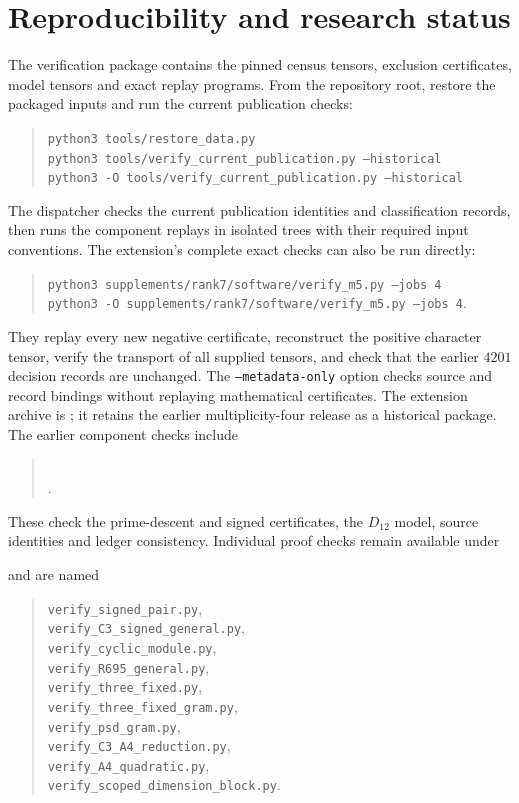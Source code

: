 \documentclass[11pt]{article}
\begin{document}
\section{Reproducibility and research status}
The verification package contains the pinned census tensors, exclusion
certificates, model tensors and exact replay programs. From the repository
root, restore the packaged inputs and run the current publication checks:
\begin{quote}\small
\texttt{python3 tools/restore\_data.py}\\
\texttt{python3 tools/verify\_current\_publication.py --historical}\\
\texttt{python3 -O tools/verify\_current\_publication.py --historical}
\end{quote}
The dispatcher checks the current publication identities and classification
records, then runs the component replays in isolated trees with their
required input conventions. The extension's complete exact checks can
also be run directly:
\begin{quote}\small
\texttt{python3 supplements/rank7/software/verify\_m5.py --jobs 4}\\
\texttt{python3 -O supplements/rank7/software/verify\_m5.py --jobs 4}.
\end{quote}
They replay every new negative certificate, reconstruct the positive
character tensor, verify the transport of all supplied tensors, and
check that the earlier $4201$ decision records are unchanged.
The \texttt{--metadata-only} option checks source and record bindings
without replaying mathematical certificates. The extension archive is
; it
retains the earlier multiplicity-four release as a historical package.
The earlier component checks include
\begin{quote}\small
{}\\
.
\end{quote}
These check the prime-descent and signed certificates, the $D_{12}$ model,
source identities and ledger consistency. Individual proof checks remain
available under
\begin{quote}\small
{}
\end{quote}
and are named
\begin{quote}\small
\texttt{verify\_signed\_pair.py},\\
\texttt{verify\_C3\_signed\_general.py},\\
\texttt{verify\_cyclic\_module.py},\\
\texttt{verify\_R695\_general.py},\\
\texttt{verify\_three\_fixed.py},\\
\texttt{verify\_three\_fixed\_gram.py},\\
\texttt{verify\_psd\_gram.py},\\
\texttt{verify\_C3\_A4\_reduction.py},\\
\texttt{verify\_A4\_quadratic.py},\\
\texttt{verify\_scoped\_dimension\_block.py}.
\end{quote}
\end{document}
